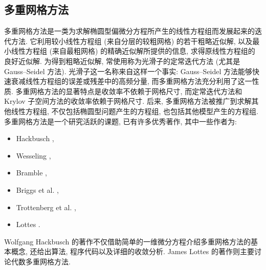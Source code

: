 \subsection{{多重网格方法}}\label{sec:multigrid-methods}
{多重网格方法是一类为求解椭圆型偏微分方程所产生的线性方程组而发展起来的迭代方法. 它利用较小线性方程组 (来自分层的较粗网格) 的若干粗略近似解, 以及最小线性方程组 (来自最粗网格) 的精确近似解所提供的信息, 求得原线性方程组的良好近似解. 为得到粗略近似解, 常使用称为光滑子的定常迭代方法 (尤其是 Gauss--Seidel 方法). 光滑子这一名称来自这样一个事实: Gauss--Seidel 方法能够快速衰减线性方程组的误差或残差中的高频分量, 而多重网格方法充分利用了这一性质.}
{多重网格方法的显著特点是收敛率不依赖于网格尺寸, 而定常迭代方法和 Krylov 子空间方法的收敛率依赖于网格尺寸. 后来, 多重网格方法被推广到求解其他线性方程组, 不仅包括椭圆型问题产生的方程组, 也包括其他模型产生的方程组.}
{多重网格方法是一个研究活跃的课题, 已有许多优秀著作, 其中一些作者为:}
\begin{itemize}
\item Hackbusch ,
\item Wesseling ,
\item Bramble ,
\item Briggs et al. ,
\item Trottenberg et al. ,
\item Lottes .
\end{itemize}
{Wolfgang Hackbusch 的著作不仅借助简单的一维微分方程介绍多重网格方法的基本概念, 还给出算法, 程序代码以及详细的收敛分析. James Lottes 的著作则主要讨论代数多重网格方法.}
